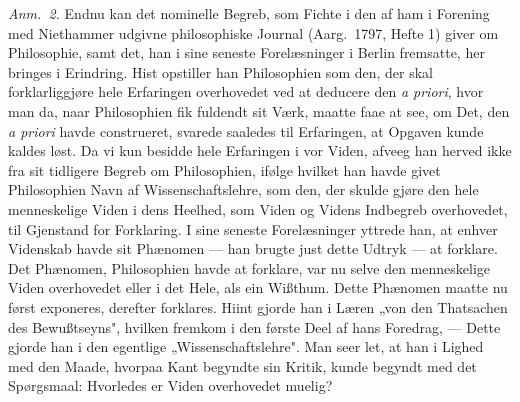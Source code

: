 \documentclass[12pt,a4paper]{book}
\newcommand{\apage}[1]{\marginnote{\footnotesize\textit{[#1]}}}
\begin{document}
{\small\emph{Anm.~2.} Endnu kan det nominelle Begreb, som Fichte i den af ham i
Forening med Niethammer udgivne philosophiske Journal (Aarg.\ 1797, Hefte 1) giver
om Philosophie, samt det, han i sine seneste Forelæsninger i Berlin fremsatte, her
bringes i Erindring. Hist opstiller han Philosophien som den, der skal
forklarliggjøre hele Erfaringen overhovedet ved at deducere den \textit{a priori},
hvor man da, naar Philosophien fik fuldendt sit Værk, maatte faae at see, om Det,
den \textit{a priori} havde construeret, svarede saaledes til Erfaringen, at Opgaven
kunde kaldes løst. Da vi kun besidde hele Erfaringen i vor Viden, afveeg han herved
ikke fra sit tidligere Begreb om Philosophien, ifølge hvilket han havde givet
Philosophien Navn af Wissenschaftslehre, som den, der skulde gjøre den hele
menneskelige Viden i dens Heelhed, som Viden og Videns Indbegreb overhovedet, til
Gjenstand for Forklaring. I sine seneste Forelæsninger yttrede han, at enhver
Videnskab havde sit Phænomen --- han brugte just dette Udtryk --- at forklare. Det
Phænomen, Philosophien havde at forklare, var nu selve den menneskelige Viden
overhovedet eller i det Hele, als ein Wißthum. Dette Phænomen maatte nu først
exponeres, derefter forklares. Hiint gjorde han i Læren „von den Thatsachen des
Bewußtseyns", hvilken fremkom i den første Deel af hans Foredrag, --- Dette gjorde
han i den egentlige „Wissenschaftslehre". Man seer let, at han i Lighed med den
Maade, hvorpaa Kant begyndte sin Kritik, kunde begyndt med det Spørgsmaal:
Hvorledes er Viden overhovedet muelig?\par} \apage{45} 
\end{document}
